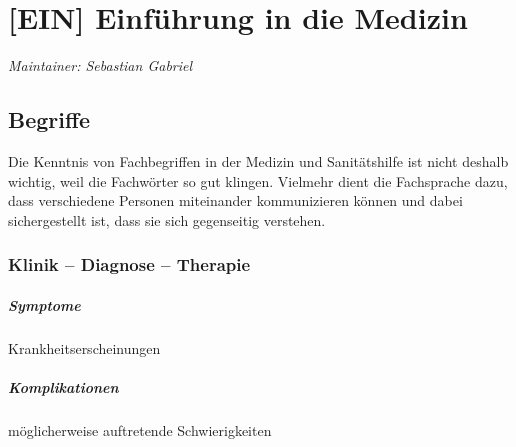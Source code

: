 \chapter{[EIN] Einführung in die Medizin}
\label{chp:EIN}

\emph{Maintainer: Sebastian Gabriel}

\minitoc


% 

\section{Begriffe}

Die Kenntnis von Fachbegriffen in der Medizin und
Sanitätshilfe ist nicht deshalb wichtig, weil die Fachwörter
so gut klingen. Vielmehr dient die Fachsprache dazu, dass
verschiedene Personen miteinander kommunizieren können und
dabei sichergestellt ist, dass sie sich gegenseitig
verstehen.

\subsection{Klinik -- Diagnose -- Therapie}

\paragraph{Symptome}  Krankheitserscheinungen
\paragraph{Komplikationen} 
möglicherweise auftretende Schwierigkeiten
